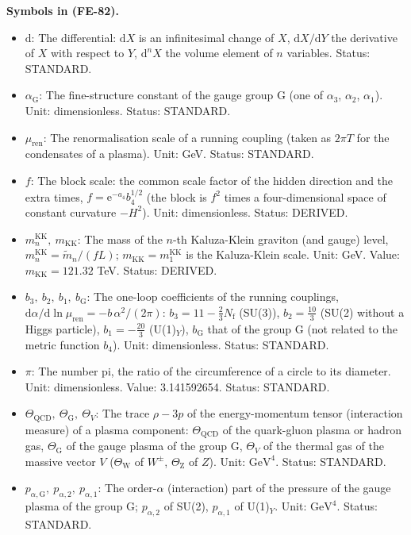\documentclass[
  10pt,
]{article}
\providecommand{\tightlist}{%
  \setlength{\itemsep}{0pt}\setlength{\parskip}{0pt}}
\begin{document}
\textbf{Symbols in (FE-82).}

\begin{itemize}
\tightlist
\item
  \(\mathrm{d}\): The differential: \(\mathrm{d}X\) is an infinitesimal
  change of \(X\), \(\mathrm{d}X/\mathrm{d}Y\) the derivative of \(X\)
  with respect to \(Y\), \(\mathrm{d}^nX\) the volume element of \(n\)
  variables. Status: STANDARD.
\item
  \(\alpha_{\mathrm{G}}\): The fine-structure constant of the gauge
  group G (one of \(\alpha_3\), \(\alpha_2\), \(\alpha_1\)). Unit:
  dimensionless. Status: STANDARD.
\item
  \(\mu_{\mathrm{ren}}\): The renormalisation scale of a running
  coupling (taken as \(2\pi T\) for the condensates of a plasma). Unit:
  GeV. Status: STANDARD.
\item
  \(f\): The block scale: the common scale factor of the hidden
  direction and the extra times, \(f = \mathrm{e}^{-a_4}b_4^{1/2}\) (the
  block is \(f^2\) times a four-dimensional space of constant curvature
  \(-H^2\)). Unit: dimensionless. Status: DERIVED.
\item
  \(m^{\mathrm{KK}}_n,\ m_{\mathrm{KK}}\): The mass of the \(n\)-th
  Kaluza-Klein graviton (and gauge) level,
  \(m^{\mathrm{KK}}_n = \tilde m_n/(fL)\);
  \(m_{\mathrm{KK}} = m^{\mathrm{KK}}_1\) is the Kaluza-Klein scale.
  Unit: GeV. Value: \(m_{\mathrm{KK}} = 121.32\) TeV. Status: DERIVED.
\item
  \(b_3,\ b_2,\ b_1,\ b_{\mathrm{G}}\): The one-loop coefficients of the
  running couplings,
  \(\mathrm{d}\alpha/\mathrm{d}\ln\mu_{\mathrm{ren}} = -b\,\alpha^2/(2\pi)\):
  \(b_3 = 11 - \frac23N_{\mathrm{f}}\) (SU(3)), \(b_2 = \frac{10}{3}\)
  (SU(2) without a Higgs particle), \(b_1 = -\frac{20}{3}\)
  (U(1)\(_Y\)), \(b_{\mathrm{G}}\) that of the group G (not related to
  the metric function \(b_4\)). Unit: dimensionless. Status: STANDARD.
\item
  \(\pi\): The number pi, the ratio of the circumference of a circle to
  its diameter. Unit: dimensionless. Value: 3.141592654. Status:
  STANDARD.
\item
  \(\Theta_{\mathrm{QCD}},\ \Theta_{\mathrm{G}},\ \Theta_V\): The trace
  \(\rho - 3p\) of the energy-momentum tensor (interaction measure) of a
  plasma component: \(\Theta_{\mathrm{QCD}}\) of the quark-gluon plasma
  or hadron gas, \(\Theta_{\mathrm{G}}\) of the gauge plasma of the
  group G, \(\Theta_V\) of the thermal gas of the massive vector \(V\)
  (\(\Theta_{\mathrm{W}}\) of \(W^\pm\), \(\Theta_{\mathrm{Z}}\) of
  \(Z\)). Unit: \(\mathrm{GeV}^{4}\). Status: STANDARD.
\item
  \(p_{\alpha,\mathrm{G}},\ p_{\alpha,2},\ p_{\alpha,1}\): The
  order-\(\alpha\) (interaction) part of the pressure of the gauge
  plasma of the group G; \(p_{\alpha,2}\) of SU(2), \(p_{\alpha,1}\) of
  U(1)\(_Y\). Unit: \(\mathrm{GeV}^{4}\). Status: STANDARD.
\end{itemize}
\end{document}
